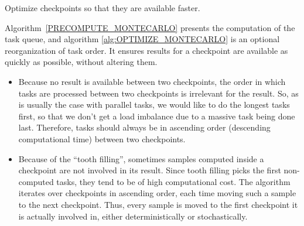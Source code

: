 \documentclass[./thesis.tex]{subfiles}
\begin{document}
\begin{algorithm}
	\caption{Optimize checkpoints so that they are available faster.}
	\label{alg:OPTIMIZE_MONTECARLO}
	
	
\end{algorithm}

Algorithm~\ref{PRECOMPUTE_MONTECARLO} presents the computation of the task queue, and
algorithm \ref{alg:OPTIMIZE_MONTECARLO} is an optional reorganization of task order. It ensures results for a checkpoint are available as quickly as possible, without altering them.
\begin{itemize}
\item
Because no result is available between two checkpoints, the order in which tasks are processed between two checkpoints is irrelevant for the result. So, as is usually the case with parallel tasks, we would like to do the longest tasks first, so that we don't get a load imbalance due to a massive task being done last. Therefore, tasks should always be in ascending order (descending computational time) between two checkpoints.
\item
Because of the ``tooth filling'', sometimes samples computed inside a checkpoint are not involved in its result. Since tooth filling picks the first non-computed tasks, they tend to be of high computational cost. The algorithm iterates over checkpoints in ascending order, each time moving such a sample to the next checkpoint. Thus, every sample is moved to the first checkpoint it is actually involved in, either deterministically or stochastically.
\end{itemize}
\end{document}
